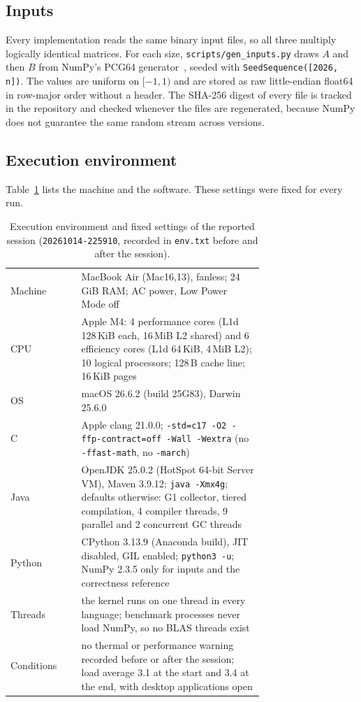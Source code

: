 \documentclass[11pt,a4paper]{article}
\newcommand{\session}{\texttt{20261014-225910}}
\begin{document}
\subsection{Inputs}

Every implementation reads the same binary input files, so all three multiply
logically identical matrices. For each size, \texttt{scripts/gen\_inputs.py}
draws $A$ and then $B$ from NumPy's PCG64 generator~\cite{harris2020}, seeded
with \texttt{SeedSequence([2026, n])}. The values are uniform on $[-1,1)$ and
are stored as raw little-endian float64 in row-major order without a header. The
SHA-256 digest of every file is tracked in the repository and checked whenever
the files are regenerated, because NumPy does not guarantee the same random
stream across versions.

\subsection{Execution environment}

Table~\ref{tab:env} lists the machine and the software. These settings were
fixed for every run.

\begin{table}[t]
\centering
\caption{Execution environment and fixed settings of the reported session
(\session, recorded in \texttt{env.txt} before and after the session).}
\label{tab:env}
\small
\begin{tabular}{@{}lp{0.72\linewidth}@{}}
\toprule
Machine & MacBook Air (Mac16,13), fanless; 24\,GiB RAM; AC power, Low Power Mode off \\
CPU & Apple M4: 4 performance cores (L1d 128\,KiB each, 16\,MiB L2 shared) and
6 efficiency cores (L1d 64\,KiB, 4\,MiB L2); 10 logical processors; 128\,B cache
line; 16\,KiB pages \\
OS & macOS 26.6.2 (build 25G83), Darwin 25.6.0 \\
C & Apple clang 21.0.0; \texttt{-std=c17 -O2 -ffp-contract=off -Wall -Wextra}
(no \texttt{-ffast-math}, no \texttt{-march}) \\
Java & OpenJDK 25.0.2 (HotSpot 64-bit Server VM), Maven 3.9.12;
\texttt{java -Xmx4g}; defaults otherwise: G1 collector, tiered compilation,
4 compiler threads, 9 parallel and 2 concurrent GC threads \\
Python & CPython 3.13.9 (Anaconda build), JIT disabled, GIL enabled;
\texttt{python3 -u}; NumPy 2.3.5 only for inputs and the correctness reference \\
Threads & the kernel runs on one thread in every language; benchmark processes
never load NumPy, so no BLAS threads exist \\
Conditions & no thermal or performance warning recorded before or after the
session; load average 3.1 at the start and 3.4 at the end, with desktop
applications open \\
\bottomrule
\end{tabular}
\end{table}
\end{document}
